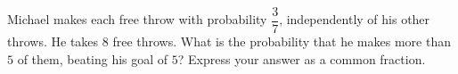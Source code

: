 Michael makes each free throw with probability $\dfrac37$, independently of his other throws. He takes $8$ free throws. What is the probability that he makes more than $5$ of them, beating his goal of $5$? Express your answer as a common fraction.
